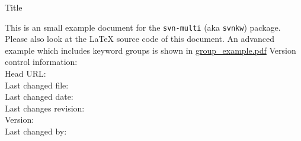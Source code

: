 \documentclass[12pt]{report}
\begin{document}
\begin{titlepage}
 \vspace{8ex}
 {\huge Title\par}
 \vspace{2ex}
 {\large \noindent This is an small example document for the \texttt{svn-multi} 
 (aka \texttt{svnkw}) package. Please also look at the LaTeX source code of this 
 document. An advanced example which includes keyword groups is shown in 
 \url{group\_example.pdf}}
 \vfill
 \flushleft\sffamily
 Version control information:\\
 Head URL: \svnnolinkurl{\svnmainurl}\\
 Last changed file: \texttt{\svnfname}\\
 Last changed date: \svndate\\
 Last changes revision: \svnrev\\
 Version: \svnFullRevision*{\svnrev}\\
 Last changed by: \svnFullAuthor*{\svnauthor}\\
\end{titlepage}


%
%
\end{document}
